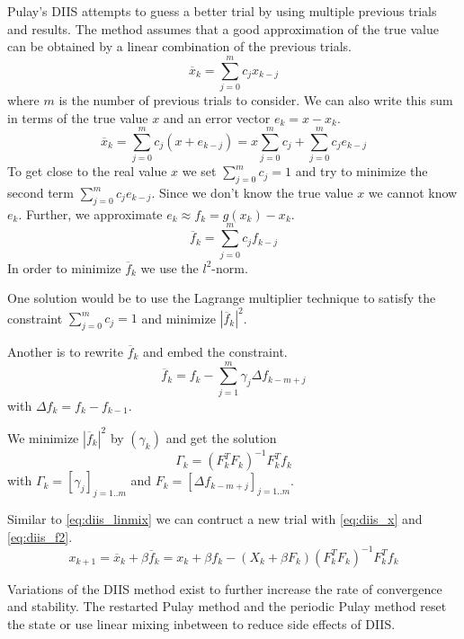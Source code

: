 Pulay's DIIS attempts to guess a better trial by using multiple previous trials and results. The method assumes that a good approximation of the true value can be obtained by a linear combination of the previous trials.
\begin{equation} \label{eq:diis_x}
\overline{x}_{k} = \sum_{j=0}^{m} c_j x_{k-j}
\end{equation}
where \(m\) is the number of previous trials to consider. We can also write this sum in terms of the true value \(x\) and an error vector \(e_{k} = x - x_{k}\).
\[\overline{x}_{k} = \sum_{j=0}^{m} c_j (x + e_{k-j}) = x \sum_{j=0}^{m} c_j + \sum_{j=0}^{m} c_j e_{k-j}\]
To get close to the real value \(x\) we set \(\sum_{j=0}^{m} c_j = 1\) and try to minimize the second term \(\sum_{j=0}^{m} c_j e_{k-j}\). Since we don't know the true value \(x\) we cannot know \(e_{k}\). Further, we approximate \(e_{k} \approx f_{k} = g(x_k) - x_k\).
\[\overline{f}_{k} = \sum_{j=0}^{m} c_j f_{k-j}\]
In order to minimize \(\overline{f}_{k}\) we use the \(l^2\)-norm.

One solution would be to use the Lagrange multiplier technique to satisfy the constraint \(\sum_{j=0}^{m} c_j = 1\) and minimize \(|\overline{f}_{k}|^2\).

Another is to rewrite \(\overline{f}_{k}\) and embed the constraint.
\begin{equation} \label{eq:diis_f2}
\overline{f}_{k} = f_k - \sum_{j=1}^{m} \gamma_j {\Delta f}_{k-m+j}
\end{equation}
with \({\Delta f}_{k} = f_k - f_{k-1}\).

We minimize \(|\overline{f}_{k}|^2\) by \((\gamma_k)\) and get the solution
\[\Gamma_k = (F_k^T F_k)^{-1} F_k^T f_k\]
with \(\Gamma_k = [\gamma_j]_{j=1..m}\) and \(F_k = [{\Delta f}_{k-m+j}]_{j=1..m}\).

Similar to \eqref{eq:diis_linmix} we can contruct a new trial with \eqref{eq:diis_x} and \eqref{eq:diis_f2}.
\begin{equation} \label{eq:diis_final}
x_{k+1} = \overline{x}_k + \beta \overline{f}_k = x_k + \beta f_k - (X_k + \beta F_k) (F_k^T F_k)^{-1} F_k^T f_k
\end{equation}

Variations of the DIIS method exist to further increase the rate of convergence and stability. The restarted Pulay method\cite{diis_restarted} and the periodic Pulay method\cite{diis_periodic} reset the state or use linear mixing inbetween to reduce side effects of DIIS.

